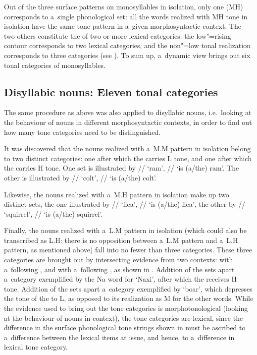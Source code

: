 Out of the three surface patterns on monosyllables in isolation, only one (MH) corresponds to
a~single phonological set: all the words realized with MH tone in isolation have the same tone
pattern in a~given morphosyntactic context. The two others constitute the  of
two or more lexical categories: the low"=rising contour corresponds to two lexical categories, and the
non"=low tonal realization corresponds to three categories (see ). To sum up, a~dynamic view brings out six tonal
categories of monosyllables.


\subsection{Disyllabic nouns: Eleven tonal categories}
\label{sec:disyllabicnouns}

The same procedure as above was also applied to disyllabic nouns, i.e.\ looking at the behaviour of
nouns in different morphosyntactic contexts, in order to find out how many tone categories need to be
distinguished.

It was discovered that the nouns realized with a~M.M pattern in isolation belong to two distinct
categories: one after which the  carries L tone, and one after which the  carries H tone. One
set is illustrated by // ‘ram’, // ‘is \mbox{(a/the)} ram’. The other is illustrated by
// ‘colt’, // ‘is \mbox{(a/the)} colt’.

Likewise, the nouns realized with a~M.H pattern in isolation make up two distinct sets, the one
illustrated by // ‘flea’, // ‘is \mbox{(a/the)} flea’, the other by // ‘squirrel’,
// ‘is \mbox{(a/the)} squirrel’.

Finally, the nouns realized with a~L.M pattern in isolation (which could also be transcribed as L.H:
there is no opposition between a~L.M pattern and a~L.H pattern, as mentioned above) fall into no
fewer than three categories. These three categories are brought out by intersecting evidence from two
contexts: with a~following , and with a~following , as shown in . Addition of the  sets apart a~category exemplified by the Na word for ‘{Naxi}’, after which the  receives H
tone. Addition of the  sets apart a~category exemplified by ‘boar’, which depresses the tone
of the  to L, as opposed to its realization as M for the other words. While the evidence
used to bring out the tone categories is morphotonological (looking at the behaviour of nouns in
context), the tone categories are lexical, since the difference in the
surface phonological tone strings shown in  must be ascribed to a~difference between the
lexical items at issue, and hence, to a~difference in lexical tone category.

